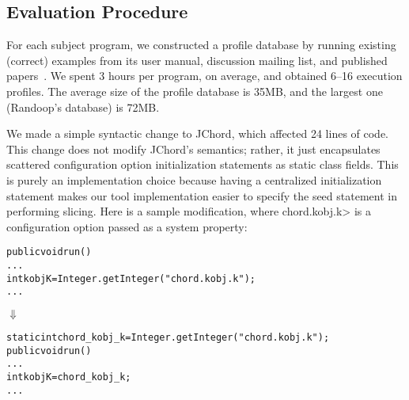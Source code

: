 \subsection{Evaluation Procedure}

For each subject program, we constructed a profile database
by running existing (correct) examples from its user manual, discussion
mailing list, and published papers~\cite{PachecoLET2007, Beschastnikh:2011, Rabkin:2011:PPC}.
We spent 3 hours per program, on average, and obtained 6--16 execution profiles.
The average size of the profile database is 35MB, and the largest one (Randoop's
database) is 72MB.



We made a simple syntactic change to JChord, which affected 24 
lines of code. This change
does not modify JChord's semantics; rather, it just encapsulates
scattered configuration option initialization statements 
as static class fields. This is purely an implementation
choice because having a centralized initialization statement
makes our tool implementation easier to specify the seed statement
in performing slicing. Here is a sample modification, where 
\<chord.kobj.k> 
is a configuration option
passed as a system property:


\begin{CodeOut}
\begin{alltt}
public void run() \ttlcb
  ...
  int kobjK = Integer.getInteger("chord.kobj.k");
  ...
\ttrcb
\end{alltt}
\end{CodeOut}
\vspace{-4mm}
\hspace{20mm}$\Downarrow$ 
\begin{CodeOut}
\begin{alltt}
static int chord\_kobj\_k = Integer.getInteger("chord.kobj.k");
public void run() \ttlcb
  ...
  int kobjK = chord\_kobj\_k; 
  ...
\ttrcb
\end{alltt}
\end{CodeOut}





